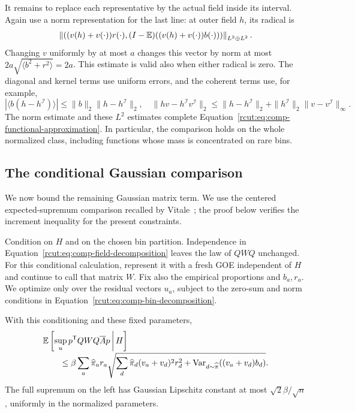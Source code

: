It remains to replace each representative by the actual field inside
its interval.  Again use a norm representation for the last line:
at outer field $h$, its radical is
\[
 \left\|\left((v(h)+v(\cdot))r(\cdot),
        (I-\mathbb E)((v(h)+v(\cdot))b(\cdot))\right)\right\|_{L^2\oplus L^2}.
\]
Changing $v$ uniformly by at most $a$ changes this vector by norm
at most $2a\sqrt{\langle b^2+r^2\rangle}=2a$.
This estimate is valid also when either radical is zero.
The diagonal and kernel terms use uniform errors, and the coherent
terms use, for example,
\[
 |\langle b(h-h^{\mathcal I})\rangle|
       \le\|b\|_2\|h-h^{\mathcal I}\|_2,
 \quad
 \|hv-h^{\mathcal I}v^{\mathcal I}\|_2
       \le\|h-h^{\mathcal I}\|_2
             +\|h^{\mathcal I}\|_2\|v-v^{\mathcal I}\|_\infty.
\]
The norm estimate and these $L^2$ estimates complete
Equation~\eqref{rcut:eq:comp-functional-approximation}.  In particular,
the comparison holds on the whole normalized class, including functions
whose mass is concentrated on rare bins.

\subsection{The conditional Gaussian comparison}

We now bound the remaining Gaussian matrix term.  We use the
centered expected-supremum comparison recalled by
Vitale~\cite[Equation~(3)]{Vitale2000}; the proof below verifies the
increment inequality for the present constraints.

Condition on $H$ and on the chosen bin partition.  Independence in
Equation~\eqref{rcut:eq:comp-field-decomposition} leaves the law of
$QWQ$ unchanged.  For this conditional calculation, represent it with
a fresh GOE independent of $H$ and continue to call that matrix $W$.
Fix also the empirical proportions and $b_a,r_a$.  We optimize only
over the residual vectors $u_a$, subject to the zero-sum and norm
conditions in Equation~\eqref{rcut:eq:comp-bin-decomposition}.

\begin{lemma}
 \label{rcut:lem:comp-bin-gaussian}
 With this conditioning and these fixed parameters,
 \begin{align}
 &\mathbb E\left[\sup_u
       p^{\mathsf T}QWQ\overline A p\,\middle|\,H\right]
 \notag\\[-2pt]
 &\qquad\le\beta\sum_a\widehat\pi_a r_a
    \sqrt{\sum_d\widehat\pi_d(v_a+v_d)^2r_d^2
           +\operatorname{Var}_{d\sim\widehat\pi}((v_a+v_d)b_d)}.
 \label{rcut:eq:comp-bin-gaussian-bound}
 \end{align}
 The full supremum on the left has Gaussian Lipschitz constant at
 most $\sqrt2\beta/\sqrt n$, uniformly in the normalized parameters.
\end{lemma}

